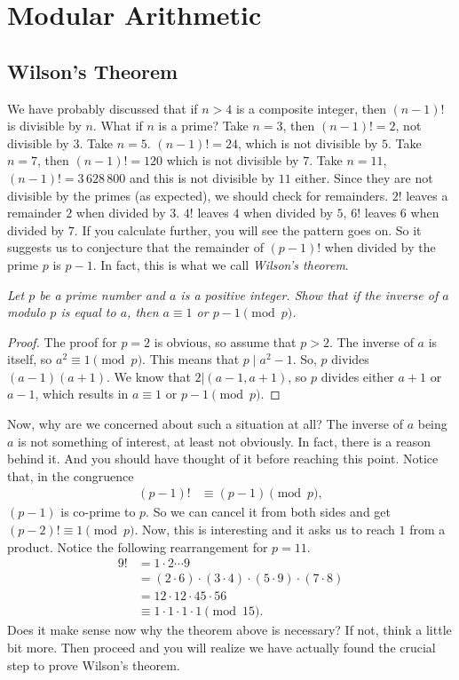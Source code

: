 \documentclass{subfile}
\begin{document}
\chapter{Modular Arithmetic}\label{ch:congruence}
	
			
	    
	
	\section{Wilson's Theorem}
	We have probably discussed that if $n>4$ is a composite integer, then $(n-1)!$ is divisible by $n$. What if $n$ is a prime? Take $n=3$, then $(n-1)!=2$, not divisible by $3$. Take $n=5$. $(n-1)!=24$, which is not divisible by $5$. Take $n=7$, then $(n-1)!=120$ which is not divisible by $7$. Take $n=11$, $(n-1)!=3\, 628\, 800$ and this is not divisible by $11$ either. Since they are not divisible by the primes (as expected), we should check for remainders. $2!$ leaves a remainder $2$ when divided by $3$. $4!$ leaves $4$ when divided by $5$, $6!$ leaves $6$ when divided by $7$. If you calculate further, you will see the pattern goes on. So it suggests us to conjecture that the remainder of $(p-1)!$ when divided by the prime $p$ is $p-1$. In fact, this is what we call \textit{Wilson's theorem}.
		\begin{theorem} \label{thm:selfinverse} \slshape
			Let $p$ be a prime number and $a$ is a positive integer. Show that if the inverse of $a$ modulo $p$ is equal to $a$, then $a \equiv 1$ or $p-1 \pmod p$.
		\end{theorem}
		
		\begin{proof}
			The proof for $p=2$ is obvious, so assume that $p>2$. The inverse of $a$ is itself, so $a^2 \equiv 1 \pmod p$. This means that $p\mid a^2-1$. So, $p$ divides $(a-1)(a+1)$. We know that $2 | (a-1, a+1)$, so $p$ divides either $a+1$ or $a-1$, which results in $a \equiv 1$ or $p-1 \pmod p$.
		\end{proof}
	Now, why are we concerned about such a situation at all? The inverse of $a$ being $a$ is not something of interest, at least not obviously. In fact, there is a reason behind it. And you should have thought of it before reaching this point. Notice that, in the congruence
		\begin{align*}
			(p-1)! & \equiv(p-1)\pmod p,
		\end{align*}
	$(p-1)$ is co-prime to $p$. So we can cancel it from both sides and get $(p-2)!\equiv1\pmod p$. Now, this is interesting and it asks us to reach $1$ from a product. Notice the following rearrangement for $p=11$.
		\begin{align*}
			9! & = 1\cdot2\cdots9\\
				&= \left(2\cdot6\right)\cdot\left(3\cdot4\right)\cdot\left(5\cdot9\right)\cdot\left(7\cdot8\right)\\
				& = 12\cdot12\cdot45\cdot56\\
				& \equiv1\cdot1\cdot1\cdot1\pmod{15}.
		\end{align*}
	Does it make sense now why the theorem above is necessary? If not, think a little bit more. Then proceed and you will realize we have actually found the crucial step to prove Wilson's theorem.
	
\end{document}
